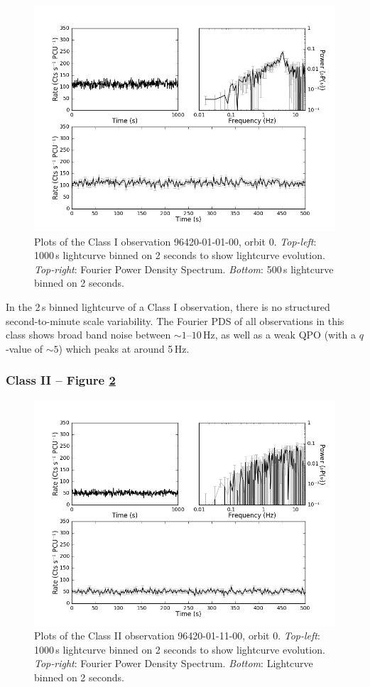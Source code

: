 \begin{figure}
    \includegraphics[width=0.8\columnwidth, trim = 0.6cm 0 3.9cm 0]{images/Bmulti.png}
    \captionsetup{singlelinecheck=off}
    \caption[Characteristic lightcurves and a power spectrum of Type I variability.]{Plots of the Class I observation 96420-01-01-00, orbit 0.  \textit{Top-left}: 1000\,s lightcurve binned on 2 seconds to show lightcurve evolution.  \textit{Top-right}: Fourier Power Density Spectrum.  \textit{Bottom}: 500\,s lightcurve binned on 2 seconds.}
   \label{fig:Bmulti}
\end{figure}

In the 2\,s binned lightcurve of a Class I observation, there is no structured second-to-minute scale variability.  The Fourier PDS of all observations in this class shows broad band noise between $\sim1$--$10$\,Hz, as well as a weak QPO (with a $q$-value of $\sim5$) which peaks at around 5\,Hz.

\subsubsection{Class II -- Figure \ref{fig:Emulti}}

\begin{figure}
    \includegraphics[width=0.8\columnwidth, trim = 0.6cm 0 3.9cm 0]{images/Emulti.png}
    \captionsetup{singlelinecheck=off}
    \caption[Characteristic lightcurves and a power spectrum of Type II variability.]{Plots of the Class II observation 96420-01-11-00, orbit 0.  \textit{Top-left}:  1000\,s lightcurve binned on 2 seconds to show lightcurve evolution.  \textit{Top-right}: Fourier Power Density Spectrum.  \textit{Bottom}: Lightcurve binned on 2 seconds.}
   \label{fig:Emulti}
\end{figure}

